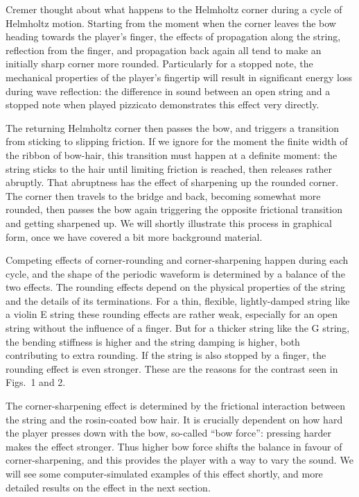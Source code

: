   Cremer thought about what happens to the Helmholtz corner during a cycle of 
  Helmholtz motion. Starting from the moment when the corner leaves the bow 
  heading towards the player’s finger, the effects of propagation along the 
  string, reflection from the finger, and propagation back again all tend to 
  make an initially sharp corner more rounded. Particularly for a stopped note, 
  the mechanical properties of the player’s fingertip will result in 
  significant energy loss during wave reflection: the difference in sound 
  between an open string and a stopped note when played pizzicato demonstrates 
  this effect very directly. 

  The returning Helmholtz corner then passes the bow, and triggers a transition 
  from sticking to slipping friction. If we ignore for the moment the finite 
  width of the ribbon of bow-hair, this transition must happen at a definite 
  moment: the string sticks to the hair until limiting friction is reached, 
  then releases rather abruptly. That abruptness has the effect of sharpening 
  up the rounded corner. The corner then travels to the bridge and back, 
  becoming somewhat more rounded, then passes the bow again triggering the 
  opposite frictional transition and getting sharpened up. We will shortly 
  illustrate this process in graphical form, once we have covered a bit more 
  background material. 

  Competing effects of corner-rounding and corner-sharpening happen during each 
  cycle, and the shape of the periodic waveform is determined by a balance of 
  the two effects. The rounding effects depend on the physical properties of 
  the string and the details of its terminations. For a thin, flexible, 
  lightly-damped string like a violin E string these rounding effects are 
  rather weak, especially for an open string without the influence of a finger. 
  But for a thicker string like the G string, the bending stiffness is higher 
  and the string damping is higher, both contributing to extra rounding. If the 
  string is also stopped by a finger, the rounding effect is even stronger. 
  These are the reasons for the contrast seen in Figs.\ 1 and 2. 

  The corner-sharpening effect is determined by the frictional interaction 
  between the string and the rosin-coated bow hair. It is crucially dependent 
  on how hard the player presses down with the bow, so-called “bow force”: 
  pressing harder makes the effect stronger. Thus higher bow force shifts the 
  balance in favour of corner-sharpening, and this provides the player with a 
  way to vary the sound. We will see some computer-simulated examples of this 
  effect shortly, and more detailed results on the effect in the next section. 


